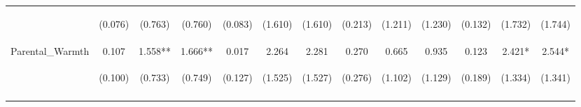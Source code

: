 \begin{tabular}{lcccccccccccc}
 & \begin{footnotesize}(0.076)\end{footnotesize} & \begin{footnotesize}(0.763)\end{footnotesize} & \begin{footnotesize}(0.760)\end{footnotesize} & \begin{footnotesize}(0.083)\end{footnotesize} & \begin{footnotesize}(1.610)\end{footnotesize} & \begin{footnotesize}(1.610)\end{footnotesize} & \begin{footnotesize}(0.213)\end{footnotesize} & \begin{footnotesize}(1.211)\end{footnotesize} & \begin{footnotesize}(1.230)\end{footnotesize} & \begin{footnotesize}(0.132)\end{footnotesize} & \begin{footnotesize}(1.732)\end{footnotesize} & \begin{footnotesize}(1.744)\end{footnotesize}\\
\noalign{\smallskip}Parental_Warmth & 0.107 & 1.558** & 1.666** & 0.017 & 2.264 & 2.281 & 0.270 & 0.665 & 0.935 & 0.123 & 2.421* & 2.544*\\
 & \begin{footnotesize}(0.100)\end{footnotesize} & \begin{footnotesize}(0.733)\end{footnotesize} & \begin{footnotesize}(0.749)\end{footnotesize} & \begin{footnotesize}(0.127)\end{footnotesize} & \begin{footnotesize}(1.525)\end{footnotesize} & \begin{footnotesize}(1.527)\end{footnotesize} & \begin{footnotesize}(0.276)\end{footnotesize} & \begin{footnotesize}(1.102)\end{footnotesize} & \begin{footnotesize}(1.129)\end{footnotesize} & \begin{footnotesize}(0.189)\end{footnotesize} & \begin{footnotesize}(1.334)\end{footnotesize} & \begin{footnotesize}(1.341)\end{footnotesize}\\
\noalign{\smallskip}\hline\end{tabular}\\

